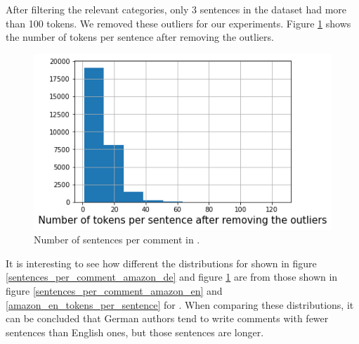 After filtering the relevant categories, only 3 sentences in the dataset had more than 100 tokens. We removed these outliers for our experiments. Figure \ref{amazon_de_tokens_per_sentence} shows the number of tokens per sentence after removing the outliers.\\
\begin{figure}[h]
\centerline{\includegraphics[scale=.5]{images/tokens_per_sentence_amazon_de_after.png}}
\caption{Number of sentences per comment in \dataDE.}
\label{amazon_de_tokens_per_sentence}
\end{figure}
It is interesting to see how different the distributions for \dataDE shown in figure \ref{sentences_per_comment_amazon_de} and figure \ref{amazon_de_tokens_per_sentence} are from those shown in figure \ref{sentences_per_comment_amazon_en} and \ref{amazon_en_tokens_per_sentence} for \dataEN. When comparing these distributions, it can be concluded that German authors tend to write comments with fewer sentences than English ones, but those sentences are longer.
